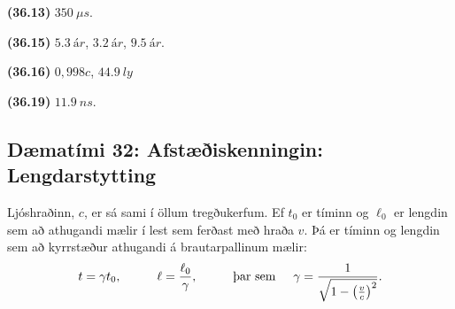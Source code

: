\ifdefined \wholebook \else\documentclass[oneside]{book}\usepackage{EdlBook}\graphicspath{{figures/}}
\begin{document}
\begin{tcolorbox}
\begin{enumerate*}[label = ]
  \item \textbf{(36.13)} $\SI{350}{\mu s}$.
  \item \textbf{(36.15)} $\SI{5,3}{ár}$, $\SI{3,2}{ár}$, $\SI{9,5}{ár}$.
  \item \textbf{(36.16)} $0,998c$, $\SI{44,9}{ly}$
  \item \textbf{(36.19)} $\SI{11.9}{ns}$.
\end{enumerate*}
\end{tcolorbox}

\newpage

\subsection*{Dæmatími 32: Afstæðiskenningin: Lengdarstytting}

\begin{tcolorbox}
Ljóshraðinn, $c$, er sá sami í öllum tregðukerfum. Ef $t_0$ er tíminn og $\ell_0$ er lengdin sem að athugandi mælir í lest sem ferðast með hraða $v$. Þá er tíminn og lengdin sem að kyrrstæður athugandi á brautarpallinum mælir:
\begin{align*}
    t = \gamma t_0, \hspace{1cm} \ell = \frac{\ell_0}{\gamma}, \hspace{1cm} \text{þar sem} \hspace{0.5cm} \gamma = \frac{1}{\sqrt{1-\left(\frac{v}{c}\right)^2}}.
\end{align*}
\end{tcolorbox}
\end{document}
